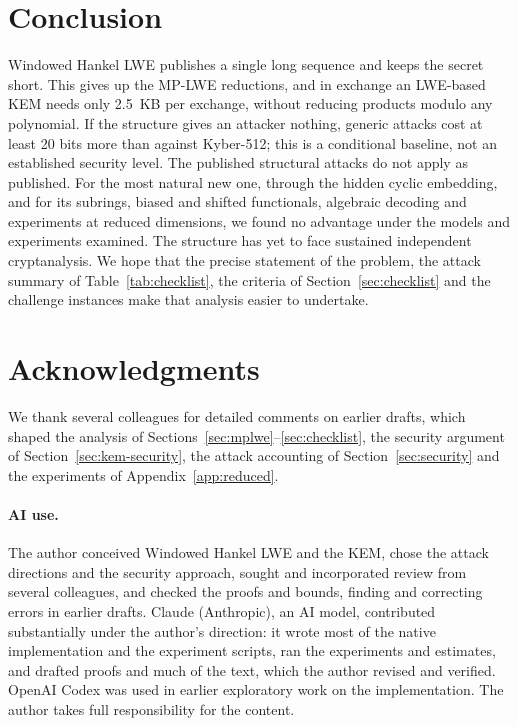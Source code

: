 \documentclass[11pt,a4paper]{article}
\theoremstyle{definition}
\begin{document}
\section{Conclusion}
Windowed Hankel LWE publishes a single long sequence and keeps the secret short. This gives up the MP-LWE reductions, and in exchange an LWE-based KEM needs only 2.5~KB per exchange, without reducing products modulo any polynomial. If the structure gives an attacker nothing, generic attacks cost at least 20 bits more than against Kyber-512; this is a conditional baseline, not an established security level. The published structural attacks do not apply as published. For the most natural new one, through the hidden cyclic embedding, and for its subrings, biased and shifted functionals, algebraic decoding and experiments at reduced dimensions, we found no advantage under the models and experiments examined. The structure has yet to face sustained independent cryptanalysis. We hope that the precise statement of the problem, the attack summary of Table~\ref{tab:checklist}, the criteria of Section~\ref{sec:checklist} and the challenge instances make that analysis easier to undertake.

\section*{Acknowledgments}
We thank several colleagues for detailed comments on earlier drafts, which shaped the analysis of Sections~\ref{sec:mplwe}--\ref{sec:checklist}, the security argument of Section~\ref{sec:kem-security}, the attack accounting of Section~\ref{sec:security} and the experiments of Appendix~\ref{app:reduced}. 

\paragraph{AI use.} The author conceived Windowed Hankel LWE and the KEM, chose the attack directions and the security approach, sought and incorporated review from several colleagues, and checked the proofs and bounds, finding and correcting errors in earlier drafts. Claude (Anthropic), an AI model, contributed substantially under the author's direction: it wrote most of the native implementation and the experiment scripts, ran the experiments and estimates, and drafted proofs and much of the text, which the author revised and verified. OpenAI Codex was used in earlier exploratory work on the implementation. The author takes full responsibility for the content.
\end{document}
